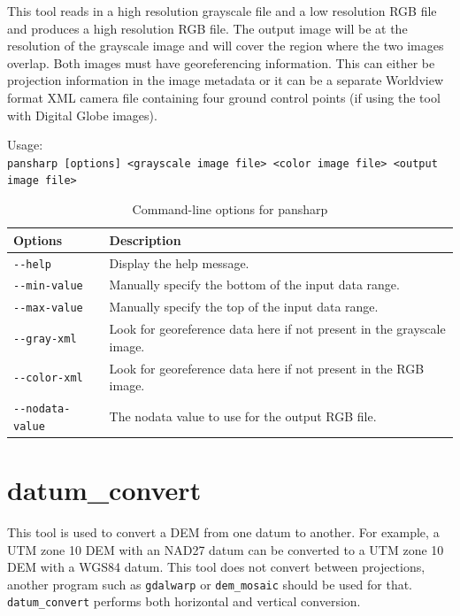 This tool reads in a high resolution grayscale file and a low resolution RGB file and produces
a high resolution RGB file.  The output image will be at the resolution of the grayscale image
and will cover the region where the two images overlap.  Both images must have georeferencing
information.  This can either be projection information in the image metadata or it can be a
separate Worldview format XML camera file containing four ground control points
(if using the tool with Digital Globe images).


\medskip

Usage:\\
\hspace*{2em}\texttt{pansharp [options] <grayscale image file> <color image file> <output image file>}

\medskip

\begin{longtable}{|l|p{10cm}|}
\caption{Command-line options for pansharp}
\label{tbl:pansharp}
\endfirsthead
\endhead
\endfoot
\endlastfoot
\hline
Options & Description \\ \hline \hline
\texttt{-\/-help} & Display the help message.\\ \hline
\texttt{-\/-min-value} & Manually specify the bottom of the input data range.\\ \hline
\texttt{-\/-max-value} & Manually specify the top of the input data range.\\ \hline
\texttt{-\/-gray-xml} & Look for georeference data here if not present in the grayscale image.\\ \hline
\texttt{-\/-color-xml} & Look for georeference data here if not present in the RGB image.\\ \hline
\texttt{-\/-nodata-value} & The nodata value to use for the output RGB file.\\ \hline
\end{longtable}

\section{datum\_convert}
\label{datumconvert}

This tool is used to convert a DEM from one datum to another.  For
example, a UTM zone 10 DEM with an NAD27 datum can be converted to a UTM
zone 10 DEM with a WGS84 datum.  This tool does not convert between
projections, another program such as \texttt{gdalwarp} or
\texttt{dem\_mosaic} should be used for that. \texttt{datum\_convert} performs both
horizontal and vertical conversion.

